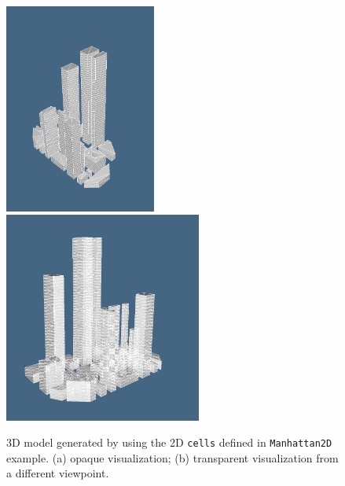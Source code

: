 \begin{figure}
   \includegraphics[width=1.955in]{chapter-01/figs/manhattan3d-1.pdf}
   \includegraphics[width=2.55in]{chapter-01/figs/manhattan3d-2.pdf}
\caption{3D model generated by using the 2D \texttt{cells} defined in \texttt{Manhattan2D} example.
 (a) opaque visualization; (b) transparent visualization from a different viewpoint.}
\label{fig:1:FP3D}
\end{figure}

